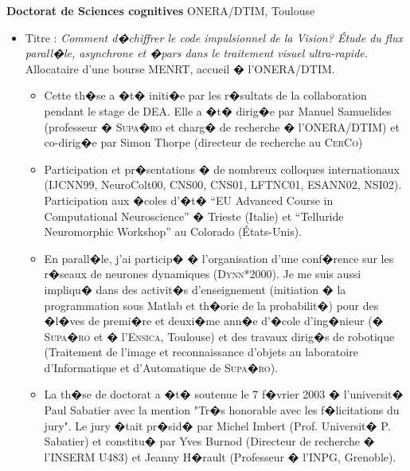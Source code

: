 \vspace*{.3cm}
	\textbf{Doctorat de Sciences cognitives} ONERA/DTIM, Toulouse \hfill {} \\
\vspace*{-.15in}
\begin{itemize}
\item[] Titre : \emph{Comment d�chiffrer le code impulsionnel de la Vision? \'Etude du flux parall�le, asynchrone et �pars  dans le traitement visuel ultra-rapide.}  Allocataire d'une bourse MENRT, accueil �  l'ONERA/DTIM.
\begin{itemize}
		\item %
		Cette th�se a �t� initi�e par les r�sultats de la collaboration pendant le stage de DEA. Elle a �t� dirig�e par Manuel Samuelides (professeur �  \textsc{Supa�ro} et charg� de recherche �  l'ONERA/DTIM) et co-dirig�e par Simon Thorpe (directeur de recherche au \textsc{CerCo})
		\item Participation et pr�sentations �  de nombreux colloques internationaux (IJCNN99, NeuroColt00, CNS00, CNS01, LFTNC01, ESANN02, NSI02). Participation aux �coles d'�t� ``EU Advanced Course in Computational Neuroscience'' �  Trieste (Italie) et ``Telluride Neuromorphic Workshop'' au Colorado (\'Etats-Unis).
		\item %
		En parall�le, j'ai particip� �  l'organisation d'une conf�rence sur les r�seaux de neurones dynamiques (\textsc{Dynn}*2000). Je me suis aussi impliqu� dans des activit�s d'enseignement (initiation �  la programmation sous Matlab et th�orie de la probabilit�) pour des �l�ves de premi�re et deuxi�me ann�e d'�cole d'ing�nieur (�  \textsc{Supa�ro} et �  l'\textsc{Ensica}, Toulouse) et des travaux dirig�s de robotique (Traitement de l'image et reconnaissance d'objets au laboratoire d'Informatique et d'Automatique de \textsc{Supa�ro}). %
		\item %
		La th�se de doctorat a �t� soutenue le 7 f�vrier 2003 �  l'universit� Paul Sabatier avec la mention "Tr�s honorable avec les f�licitations du jury". Le jury �tait pr�sid� par Michel Imbert (Prof. Universit� P. Sabatier) et constitu� par Yves Burnod (Directeur de recherche �  l'\textsc{INSERM} U483) et Jeanny H�rault (Professeur �  l'INPG, Grenoble).
	\end{itemize} %
\end{itemize} %



